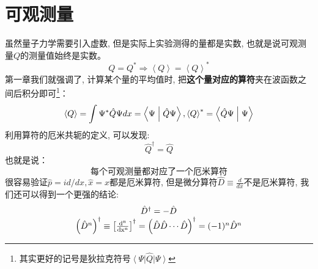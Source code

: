\documentclass[a4paper,zihao=-4,linespread=1]{ctexrep}
\newenvironment{lequation}{\large\begin{equation}}{\end{equation}}
\begin{document}
    \section{可观测量}
    虽然量子力学需要引入虚数, 但是实际上实验测得的量都是实数, 也就是说可观测量$Q$的测量值始终是实数。
    \[Q = {Q^*} \Rightarrow \left\langle Q \right\rangle  = {\left\langle Q \right\rangle ^*}\]
    第一章我们就强调了, 计算某个量的平均值时, 把\textbf{这个量对应的算符}夹在波函数之间后积分即可\footnote[1]{其实更好的记号是狄拉克符号$\left\langle \Psi  \right|\hat Q\left| \Psi  \right\rangle $}：
    \[\left\langle Q \right\rangle  = \int {{\Psi ^*}\hat Q\Psi dx}  = \left\langle {\Psi }\mathrel{\left | {\vphantom {\Psi  {\hat Q\Psi }}}\right. \kern-\nulldelimiterspace}
    {{\hat Q\Psi }} \right\rangle ,{\left\langle Q \right\rangle ^*} = \left\langle {{\hat Q\Psi }}\mathrel{\left | {\vphantom {{\hat Q\Psi } \Psi }}\right. \kern-\nulldelimiterspace}
    {\Psi } \right\rangle \]
    利用算符的厄米共轭的定义, 可以发现:
    \begin{equation}
        \boxed{
            \hat{Q}^\dagger=\hat{Q}
        }
    \end{equation}
    也就是说：
    \begin{equation}
        \boxed{
            \text{每个可观测量都对应了一个厄米算符}
        }
    \end{equation}
    很容易验证$\hat{p}=id/dx,\hat{x}=x$都是厄米算符, 但是微分算符$\hat{D}\equiv\frac{d}{dx}$不是厄米算符, 我们还可以得到一个更强的结论:
    \begin{lequation}
        \begin{array}{c}
            \hat{D}^\dagger = -\hat{D} \\ 
            \left(\hat{D}^n\right)^\dagger\equiv\left[\frac{\rm{d}^n}{\rm{d}x^n} \right]^\dagger=\left(\hat{D}\hat{D}\cdots\hat{D}\right)^\dagger=(-1)^n\hat{D}^n
        \end{array}
    \end{lequation}
\end{document}

